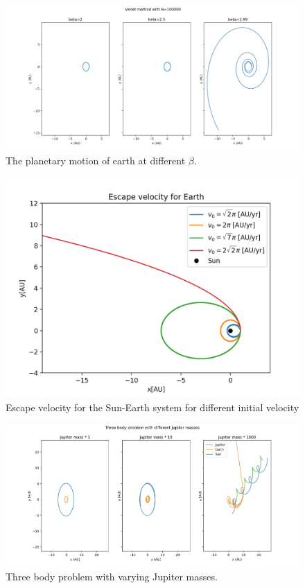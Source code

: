 \documentclass{article}
\begin{document}
\begin{figure}[H]
	\centering
	\includegraphics[width=120mm]{Force_beta}
	\caption{The planetary motion of earth at different $\beta$.}
	\label{fig:Force_beta}
\end{figure}


\begin{figure}[H]
	\centering
	\includegraphics[width=120mm]{esc_vel_plot.png}
	\caption{Escape velocity for the Sun-Earth system for different initial velocity}
	\label{fig:esc}
\end{figure}

\begin{figure}[H]
	\centering
	\includegraphics[width=120mm]{Jup_mass}
	\caption{Three body problem with varying Jupiter masses.}
	\label{fig:Jup_mass}
\end{figure}
\end{document}
